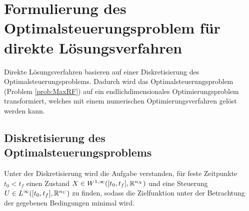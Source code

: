 \chapter{Formulierung des Optimalsteuerungsproblem für direkte Lösungsverfahren}

Direkte Lösungsverfahren basieren auf einer Diskretisierung des Optimalsteuerungsproblems. Dadurch wird das Optimalsteuerungsproblem (Problem \ref{prob:MaxRF}) auf ein endlichdimensionales Optimierungsproblem transformiert, welches mit einem numerischen Optimierungsverfahren gelöst werden kann.












\section{Diskretisierung des Optimalsteuerungsproblems}
Unter der Diskretisierung wird die Aufgabe verstanden, für feste Zeitpunkte $t_0 < t_f$ einen Zustand $X \in W^{1, \infty} ([t_0,t_f], \mathbb{R}^{n_X})$ und eine Steuerung $U \in L^{\infty} ([t_0,t_f], \mathbb{R}^{n_U})$ zu finden, sodass die Zielfunktion unter der Betrachtung der gegebenen Bedingungen minimal wird.

